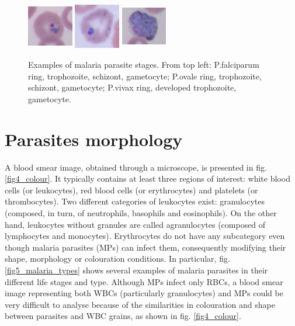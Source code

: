 \documentclass[final,a4paper,12pt,english]{UnicaPhdThesis3}
\begin{document}
\begin{figure}[!b]
	\includegraphics[width=2cm, height=2cm]{images/malaria/vivax_1_ring}
	\includegraphics[width=2cm, height=2cm]{images/malaria/vivax_2c_trophozoiteDeveloped}
	\includegraphics[width=2cm, height=2cm]{images/malaria/vivax_4_gametocyte}
	\caption{\label{fig6_malaria_stages}Examples of malaria parasite stages. From top left: P.falciparum ring, trophozoite, schizont, gametocyte;
		P.ovale ring, trophozoite, schizont, gametocyte; P.vivax ring, developed trophozoite, gametocyte. \cite{Loddo2018}}
\end{figure}

\section{Parasites morphology}
A blood smear image, obtained through a microscope, is presented in fig. \ref{fig4_colour}. It typically contains at least three regions of interest: white blood cells (or leukocytes), red blood cells (or erythrocytes) and platelets (or thrombocytes). Two different categories of leukocytes exist: granulocytes (composed, in turn, of neutrophils, basophils and eosinophils). On the other hand, leukocytes without granules are called agranulocytes (composed of lymphocytes and monocytes). Erythrocytes do not have any subcategory even though malaria parasites (MPs) can infect them, consequently modifying their shape, morphology or colouration conditions. In particular, fig. \ref{fig5_malaria_types} shows several examples of malaria parasites in their different life stages and type.
Although MPs infect only RBCs, a blood smear image representing both WBCs (particularly granulocytes) and MPs could be very difficult to analyse because of the similarities in colouration and shape between parasites and WBC grains, as shown in fig. \ref{fig4_colour}.
\end{document}
